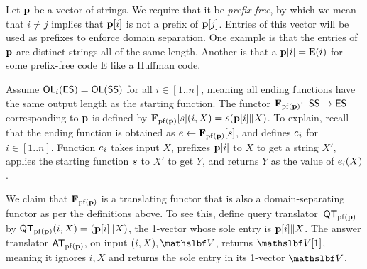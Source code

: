 Let $\mathbf{p}$ be a vector of strings. We require that it be \textit{prefix-free}, by which we mean that $i\neq j$ implies that $\mathbf{p}[i]$ is not a prefix of $\mathbf{p}[j]$. Entries of this vector will be used as prefixes to enforce domain separation. One example is that the entries of $\mathbf{p}$ are distinct strings all of the same length. Another is that a $\mathbf{p}[i]=\mathrm{E}(i)$ for some prefix-free code $\mathrm{E}$ like a Huffman code. 

Assume $\mathsf{OL}_i(\mathsf{ES})=\mathsf{OL}(\mathsf{SS})$ for all $i\in [1..n]$, meaning all ending functions have the same output length as the starting function. %
The functor $\mathbf{F}_{\mathrm{pf}(\mathbf{p})} {:\;\;} \mathsf{SS} \to \mathsf{ES}$ corresponding to $\mathbf{p}$ is defined by $\mathbf{F}_{\mathrm{pf}(\mathbf{p})}[s](i,\allowbreak X) \allowbreak = \allowbreak s(\mathbf{p}[i]\| X)$. To explain, recall that the ending function is obtained as $e \gets \mathbf{F}_{\mathrm{pf}(\mathbf{p})}[s]$, and defines $e_i$ for $i\in [1..n]$. Function $e_i$ takes input $X$, prefixes $\mathbf{p}[i]$ to $X$ to get a string $X'$, applies the starting function $s$ to $X'$ to get $Y$, and returns $Y$ as the value of $e_i(X)$. 

We claim that $\mathbf{F}_{\mathrm{pf}(\mathbf{p})}$ is a translating functor that is also a domain-separating functor as per the definitions above. To see this, define query translator~$\mathsf{QT}_{\mathrm{pf}(\mathbf{p})}$ by $\mathsf{QT}_{\mathrm{pf}(\mathbf{p})}(i,X)= (\mathbf{p}[i]\| X)$, the 1-vector whose sole entry is $\mathbf{p}[i]\| X$. The answer translator $\mathsf{AT}_{\mathrm{pf}(\mathbf{p})}$, on input $(i,X),\vecV$, returns $\vecV[1]$,  
meaning it ignores $i,X$ and returns the sole entry in its 1-vector $\vecV$.


